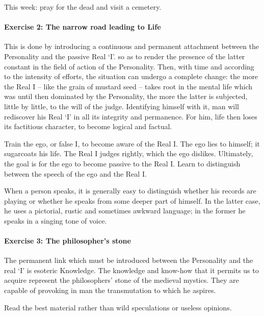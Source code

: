 This week: pray for the dead and visit a cemetery.

\paragraph{Exercise 2: The narrow road leading to Life}
\begin{quotex}
This is done by introducing a continuous and permanent attachment between the Personality and the passive Real `I'. so as to render the presence of the latter constant in the field of action of the Personality. Then, with time and according to the intensity of efforts, the situation can undergo a complete change: the more the Real I – like the grain of mustard seed – takes root in the mental life which was until then dominated by the Personality, the more the latter is subjected, little by little, to the will of the judge. Identifying himself with it, man will rediscover his Real `I' in all its integrity and permanence. For him, life then loses its factitious character, to become logical and factual. 

\end{quotex}
Train the ego, or false I, to become aware of the Real I. The ego lies to himself; it sugarcoats his life. The Real I judges rightly, which the ego dislikes. Ultimately, the goal is for the ego to become passive to the Real I. Learn to distinguish between the speech of the ego and the Real I.

\begin{quotex}
When a person speaks, it is generally easy to distinguish whether his records are playing or whether he speaks from some deeper part of himself. In the latter case, he uses a pictorial, rustic and sometimes awkward language; in the former he speaks in a singing tone of voice. 

\end{quotex}
\paragraph{Exercise 3: The philosopher's stone}
\begin{quotex}
The permanent link which must be introduced between the Personality and the real `I' is esoteric Knowledge. The knowledge and know-how that it permits us to acquire represent the philosophers' stone of the medieval mystics. They are capable of provoking in man the transmutation to which he aspires. 

\end{quotex}
Read the best material rather than wild speculations or useless opinions.

